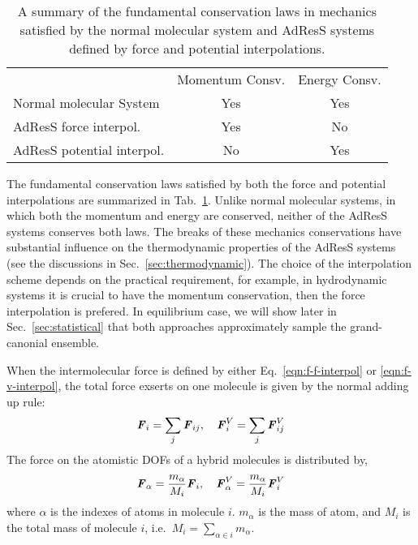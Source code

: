 \documentclass[epjST]{svjour}
\newcommand{\vect}[1]{\textbf{\textit{#1}}}
\newcommand{\moleidxone}[0]{i}
\newcommand{\moleidxtwo}[0]{j}
\newcommand{\atomidxone}[0]{\alpha}
\begin{document}
\begin{table}
  \centering
  \caption{A summary of the fundamental conservation laws in mechanics 
    satisfied by the normal molecular system and AdResS systems defined by force and potential interpolations.}
  \label{tab:conv-laws}
  \begin{tabular*}{0.8\textwidth}{@{\extracolsep{\fill}}lcc}\hline\hline
    &         Momentum Consv.     &       Energy Consv. \\
    Normal molecular System     &       {Yes}        &       {Yes}\\      
    AdResS force interpol.   &       {Yes}        &       {No}\\      
    AdResS potential interpol.  &     {No}  &       {Yes}\\\hline\hline
  \end{tabular*}
\end{table}
The fundamental conservation laws satisfied by both the force and potential interpolations
are summarized in Tab.~\ref{tab:conv-laws}. Unlike normal molecular systems, in which both
the momentum and energy are conserved, neither of the AdResS systems conserves
both laws. The breaks of these mechanics conservations have substantial influence on the thermodynamic
properties of the AdResS systems (see the discussions in Sec.~\ref{sec:thermodynamic}). The choice of the interpolation scheme depends on
the practical requirement, for example, in hydrodynamic systems it is crucial to have the momentum
conservation, then the force interpolation is prefered.
In equilibrium case, we will show later in Sec.~\ref{sec:statistical}
that both approaches approximately sample the grand-canonial ensemble.

When the intermolecular force is defined by either
Eq.~\eqref{eqn:f-f-interpol} or \eqref{eqn:f-v-interpol}, the total
force exserts on one molecule is given by the normal adding up rule:
\begin{align}
  \vect F_\moleidxone = \sum_\moleidxtwo \vect F_{\moleidxone\moleidxtwo}, \quad \vect F^V_\moleidxone = \sum_\moleidxtwo \vect F^V_{\moleidxone\moleidxtwo}
\end{align}
The force on the atomistic DOFs of a hybrid molecules is distributed 
by, 
\begin{align}
  \vect F_\atomidxone = \frac{m_\atomidxone}{M_\moleidxone}\vect F_\moleidxone, \quad   \vect F^V_\atomidxone = \frac{m_\atomidxone}{M_\moleidxone}\vect F^V_\moleidxone 
\end{align}
where  $\atomidxone$ is the indexes of atoms in molecule $\moleidxone$.
$m_\atomidxone$ is the mass of atom, and $M_\moleidxone$ is the total mass of molecule $\moleidxone$, i.e.~$M_\moleidxone = \sum_{\atomidxone\in\moleidxone}m_\atomidxone$.
\end{document}
